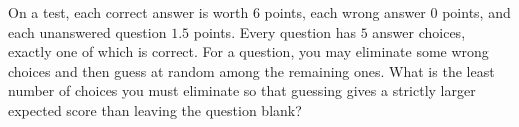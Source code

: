 On a test, each correct answer is worth $6$ points, each wrong answer $0$ points, and each unanswered question $1.5$ points. Every question has $5$ answer choices, exactly one of which is correct. For a question, you may eliminate some wrong choices and then guess at random among the remaining ones. What is the least number of choices you must eliminate so that guessing gives a strictly larger expected score than leaving the question blank?
